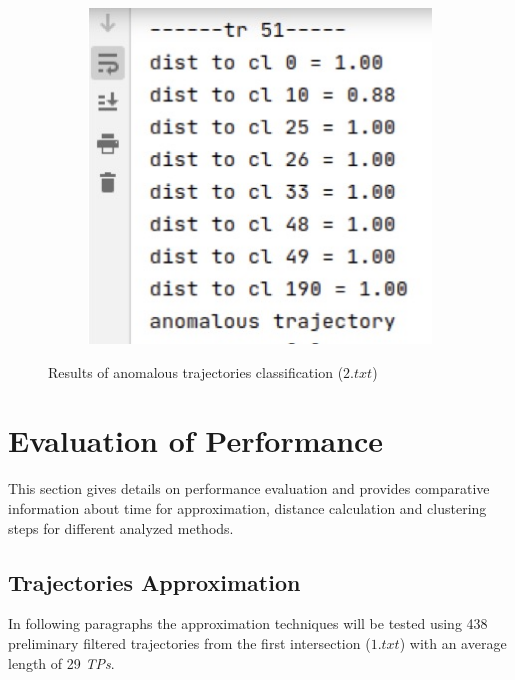 \begin{figure}[htb!]
\begin{subfigure}[!htb]{0.70\textwidth}
		\caption{}
	\end{subfigure}
	\hfill
	\begin{subfigure}[!htb]{0.28\textwidth}
		\centering{}
		\includegraphics[width=\textwidth]{images/classif-res/classif-anom-res-2-2-stat.jpeg}
		\caption{}
	\end{subfigure}
	
	\caption{Results of anomalous trajectories classification ($2.txt$)}
	\label{fig:classif-anom-res-2}
\end{figure}

\section{Evaluation of Performance}

This section gives details on performance evaluation and provides comparative information about time for approximation, distance calculation and clustering steps for different analyzed methods.

\subsection{Trajectories Approximation}

In following paragraphs the approximation techniques will be tested using 438 preliminary filtered trajectories from the first intersection ($1.txt$) with an average length of 29 \textit{TPs}.


